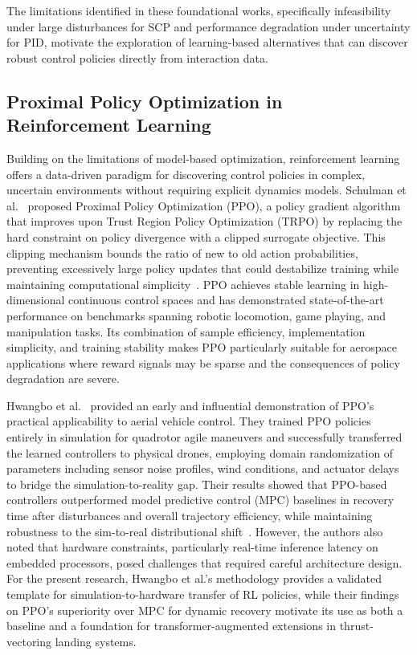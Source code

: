 \documentclass[10pt,twocolumn]{article}
\begin{document}
The limitations identified in these foundational works, specifically infeasibility under large disturbances for SCP and performance degradation under uncertainty for PID, motivate the exploration of learning-based alternatives that can discover robust control policies directly from interaction data.

\subsection{Proximal Policy Optimization in Reinforcement Learning}

Building on the limitations of model-based optimization, reinforcement learning offers a data-driven paradigm for discovering control policies in complex, uncertain environments without requiring explicit dynamics models.
Schulman et al.~\cite{schulman2017} proposed Proximal Policy Optimization (PPO), a policy gradient algorithm that improves upon Trust Region Policy Optimization (TRPO) by replacing the hard constraint on policy divergence with a clipped surrogate objective.
This clipping mechanism bounds the ratio of new to old action probabilities, preventing excessively large policy updates that could destabilize training while maintaining computational simplicity~\cite{schulman2017}.
PPO achieves stable learning in high-dimensional continuous control spaces and has demonstrated state-of-the-art performance on benchmarks spanning robotic locomotion, game playing, and manipulation tasks.
Its combination of sample efficiency, implementation simplicity, and training stability makes PPO particularly suitable for aerospace applications where reward signals may be sparse and the consequences of policy degradation are severe.

Hwangbo et al.~\cite{hwangbo2017} provided an early and influential demonstration of PPO's practical applicability to aerial vehicle control.
They trained PPO policies entirely in simulation for quadrotor agile maneuvers and successfully transferred the learned controllers to physical drones, employing domain randomization of parameters including sensor noise profiles, wind conditions, and actuator delays to bridge the simulation-to-reality gap.
Their results showed that PPO-based controllers outperformed model predictive control (MPC) baselines in recovery time after disturbances and overall trajectory efficiency, while maintaining robustness to the sim-to-real distributional shift~\cite{hwangbo2017}.
However, the authors also noted that hardware constraints, particularly real-time inference latency on embedded processors, posed challenges that required careful architecture design.
For the present research, Hwangbo et al.'s methodology provides a validated template for simulation-to-hardware transfer of RL policies, while their findings on PPO's superiority over MPC for dynamic recovery motivate its use as both a baseline and a foundation for transformer-augmented extensions in thrust-vectoring landing systems.
\end{document}
